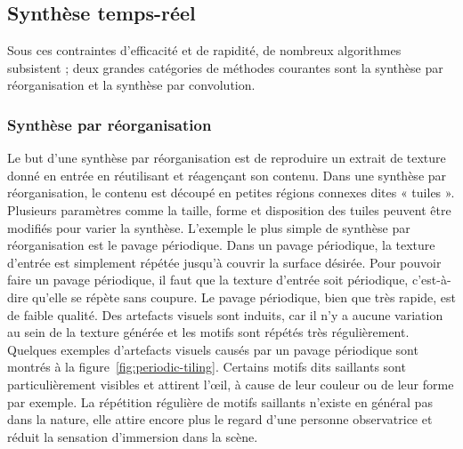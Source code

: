 \subsection{Synthèse temps-réel} %

Sous ces contraintes d'efficacité et de rapidité, de nombreux algorithmes subsistent ; deux grandes catégories de méthodes courantes sont la synthèse par réorganisation et la synthèse par convolution.

\subsubsection{Synthèse par réorganisation}

Le but d'une synthèse par réorganisation est de reproduire un extrait de texture donné en entrée en réutilisant et réagençant son contenu. Dans une synthèse par réorganisation, le contenu est découpé en petites régions connexes dites « tuiles ». Plusieurs paramètres comme la taille, forme et disposition des tuiles peuvent être modifiés pour varier la synthèse. L'exemple le plus simple de synthèse par réorganisation est le pavage périodique. Dans un pavage périodique, la texture d'entrée est simplement répétée jusqu'à couvrir la surface désirée. Pour pouvoir faire un pavage périodique, il faut que la texture d'entrée soit périodique, c'est-à-dire qu'elle se répète sans coupure. Le pavage périodique, bien que très rapide, est de faible qualité. Des artefacts visuels sont induits, car il n'y a aucune variation au sein de la texture générée et les motifs sont répétés très régulièrement. Quelques exemples d'artefacts visuels causés par un pavage périodique sont montrés à la figure~\ref{fig:periodic-tiling}. Certains motifs dits saillants sont particulièrement visibles et attirent l'œil, à cause de leur couleur ou de leur forme par exemple. La répétition régulière de motifs saillants n'existe en général pas dans la nature, elle attire encore plus le regard d'une personne observatrice et réduit la sensation d'immersion dans la scène.

\bigskip

